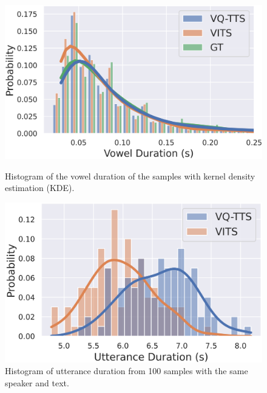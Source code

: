 \begin{figure}[!tb]
\centering
\begin{minipage}[b]{\columnwidth}
    \centering
    \includegraphics[width=\textwidth]{imgs/vowel_duration.png}
    \caption{Histogram of the vowel duration of the samples with kernel density estimation (KDE).}
    \label{fig:vowel-duration}
\end{minipage}
\hfill
\begin{minipage}[b]{\columnwidth}
    \centering
    \includegraphics[width=\textwidth]{imgs/duration.png}
    \caption{Histogram of utterance duration from 100 samples with the same speaker and text.}
    \label{fig:total-duration}
\end{minipage}
\end{figure}